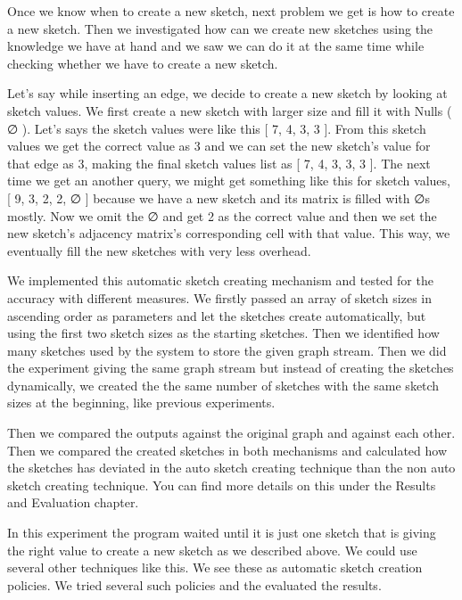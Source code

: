 \documentclass[conference]{IEEEtran}
\begin{document}
Once we know when to create a new sketch, next problem we get is how to create a new sketch. Then we investigated how can we create new sketches using the knowledge we have at hand and we saw we can do it at the same time while checking whether we have to create a new sketch.


Let’s say while inserting an edge,  we decide to create a new sketch by looking at sketch values. We first create a new sketch with larger size and fill it with Nulls ( ∅ ). Let’s says  the sketch values were like this [ 7, 4, 3, 3 ]. From this sketch values we get the correct value as 3 and we can set the new sketch's value for that edge as 3, making the final sketch values list as  [ 7, 4, 3, 3, 3 ]. The next time we get an another query, we might get something like this for sketch values, [ 9, 3, 2, 2, ∅ ] because we have a new sketch and its matrix is filled with ∅s mostly. Now we omit the ∅ and get 2 as the correct value and then we set the new sketch’s adjacency matrix’s corresponding cell with that value. This way, we eventually fill the new sketches with very less overhead.  


We implemented this automatic sketch creating mechanism and tested for the accuracy with different measures. We firstly passed an array of sketch sizes in ascending order as parameters and let the sketches create automatically, but using the first two sketch sizes as the starting sketches. Then we identified how many sketches used by the system to store the given graph stream. Then we did the experiment giving the same graph stream but instead of creating the sketches dynamically, we created the the same number of sketches with the same sketch sizes at the beginning, like previous experiments.



Then we compared the outputs against the original graph and against each other. Then we compared the created sketches in both mechanisms and calculated how the sketches has deviated in the auto sketch creating technique  than the non auto sketch creating technique. You can find more details on this under the Results and Evaluation chapter. 



In this experiment the program waited until it is just one sketch that is giving the right value to create a new sketch as we described above. We could use several other techniques like this. We see these as automatic sketch creation policies. We tried several such policies and the evaluated the results. 
\end{document}
